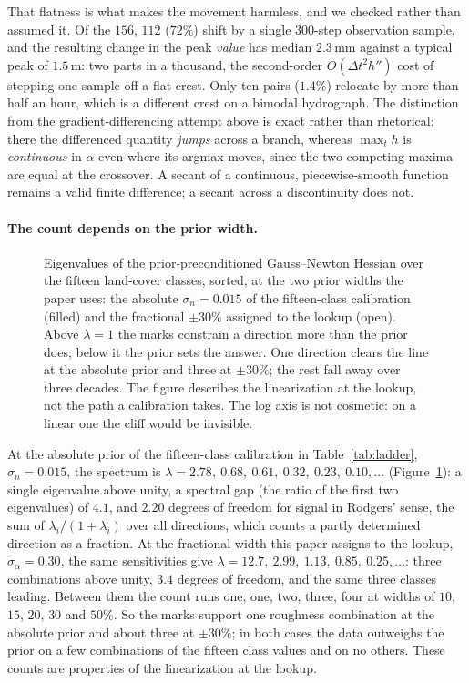 \documentclass[11pt]{article}
\begin{document}
That flatness is what makes the movement harmless, and we checked
rather than assumed it. Of the $156$, $112$ ($72\%$) shift by a single
$300$-step observation sample, and the resulting change in the peak
\emph{value} has median $2.3$\,mm against a typical peak of $1.5$\,m:
two parts in a thousand, the second-order $O(\Delta t^2 h'')$ cost of
stepping one sample off a flat crest. Only ten pairs ($1.4\%$)
relocate by more than half an hour, which is a different crest on a
bimodal hydrograph. The distinction from the gradient-differencing
attempt above is exact rather than rhetorical: there the differenced
quantity \emph{jumps} across a branch, whereas $\max_t h$ is
\emph{continuous} in $\alpha$ even where its argmax moves, since the
two competing maxima are equal at the crossover. A secant of a
continuous, piecewise-smooth function remains a valid finite
difference; a secant across a discontinuity does not.

\paragraph{The count depends on the prior width.}
\begin{figure}[t]
\centering

\caption{Eigenvalues of the prior-preconditioned Gauss--Newton Hessian
over the fifteen land-cover classes, sorted, at the two prior widths
the paper uses: the absolute $\sigma_n = 0.015$ of the fifteen-class
calibration (filled) and the fractional $\pm 30\%$ assigned to the
lookup (open). Above $\lambda = 1$ the marks constrain a direction
more than the prior does; below it the prior sets the answer. One
direction clears the line at the absolute prior and three at
$\pm 30\%$; the rest fall away over three decades. The figure
describes the linearization at the lookup, not the path a calibration
takes. The log axis is not cosmetic: on a linear one the cliff would
be invisible.}
\label{fig:spectrum}
\end{figure}

At the absolute prior of the fifteen-class calibration in
Table~\ref{tab:ladder}, $\sigma_n = 0.015$, the spectrum is
$\lambda = 2.78,\ 0.68,\ 0.61,\ 0.32,\ 0.23,\ 0.10, \dots$
(Figure~\ref{fig:spectrum}): a single eigenvalue above unity, a
spectral gap (the ratio of the first two eigenvalues) of $4.1$, and
$2.20$ degrees of freedom for signal in Rodgers' sense, the sum of
$\lambda_i/(1+\lambda_i)$ over all directions, which counts a partly
determined direction as a fraction. At the fractional width this
paper assigns to the
lookup, $\sigma_\alpha = 0.30$, the same sensitivities give
$\lambda = 12.7,\ 2.99,\ 1.13,\ 0.85,\ 0.25, \dots$: three
combinations above unity, $3.4$ degrees of freedom, and the same
three classes leading. Between them the count runs one, one, two,
three, four at widths of $10$, $15$, $20$, $30$ and $50\%$. So the
marks support one roughness combination at the absolute prior and
about three at $\pm 30\%$; in both cases the data outweighs the
prior on a few combinations of the fifteen class values and on no
others. These counts are properties of the linearization at the
lookup.
\end{document}
